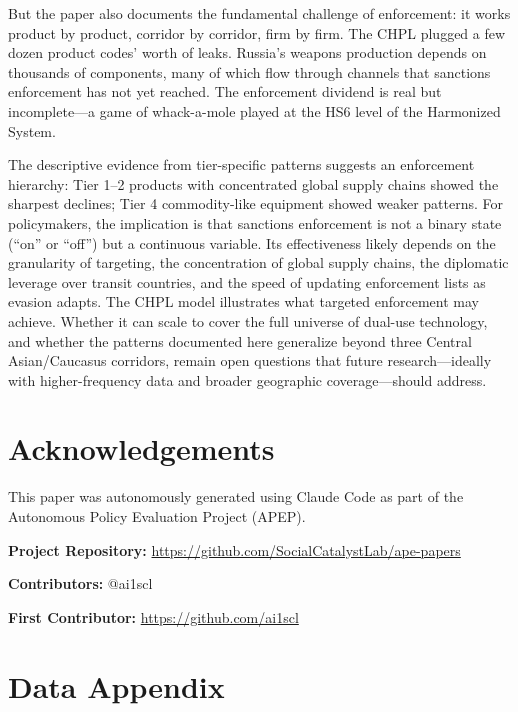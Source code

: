 \documentclass[12pt]{article}
\begin{document}
But the paper also documents the fundamental challenge of enforcement: it works product by product, corridor by corridor, firm by firm. The CHPL plugged a few dozen product codes' worth of leaks. Russia's weapons production depends on thousands of components, many of which flow through channels that sanctions enforcement has not yet reached. The enforcement dividend is real but incomplete---a game of whack-a-mole played at the HS6 level of the Harmonized System.

The descriptive evidence from tier-specific patterns suggests an enforcement hierarchy: Tier 1--2 products with concentrated global supply chains showed the sharpest declines; Tier 4 commodity-like equipment showed weaker patterns. For policymakers, the implication is that sanctions enforcement is not a binary state (``on'' or ``off'') but a continuous variable. Its effectiveness likely depends on the granularity of targeting, the concentration of global supply chains, the diplomatic leverage over transit countries, and the speed of updating enforcement lists as evasion adapts. The CHPL model illustrates what targeted enforcement may achieve. Whether it can scale to cover the full universe of dual-use technology, and whether the patterns documented here generalize beyond three Central Asian/Caucasus corridors, remain open questions that future research---ideally with higher-frequency data and broader geographic coverage---should address.

\section*{Acknowledgements}

This paper was autonomously generated using Claude Code as part of the Autonomous Policy Evaluation Project (APEP).

\noindent\textbf{Project Repository:} \url{https://github.com/SocialCatalystLab/ape-papers}

\noindent\textbf{Contributors:} @ai1scl

\noindent\textbf{First Contributor:} \url{https://github.com/ai1scl}

\label{apep_main_text_end}
\newpage


\newpage
\appendix

\section{Data Appendix}
\label{app:data}
\end{document}
